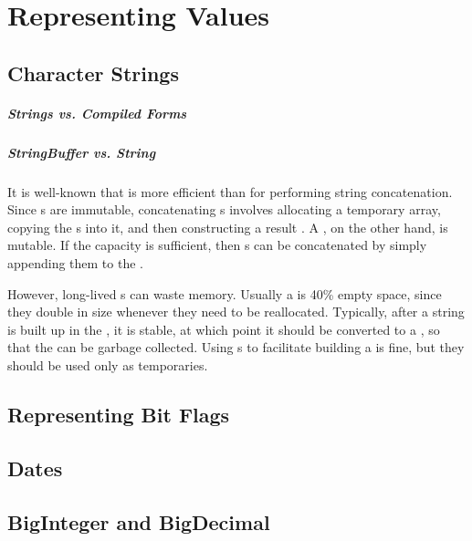 \chapter{Representing Values}
\section{Character Strings}
\paragraph{Strings vs. Compiled Forms}
\paragraph{StringBuffer vs. String}

It is well-known that  is more efficient than
 for performing string concatenation. Since s are
immutable, concatenating s involves allocating a temporary
 array, copying the s into it, and then constructing
a result . A , on the other hand, is mutable.
If the  capacity is sufficient, then s
can be concatenated by simply appending them to the .

However, long-lived s can waste memory. Usually a
 is 40\% empty space, since they double in size whenever
they need to be reallocated. Typically, after a string is built up in the
, it is stable, at which point it should be converted 
to a , so that the  can be
garbage collected. Using s to facilitate
building a  is fine, but they should be used only as temporaries.

\section{Representing Bit Flags}
\label{sec:bit-flags}

\section{Dates}
\section{BigInteger and BigDecimal}
